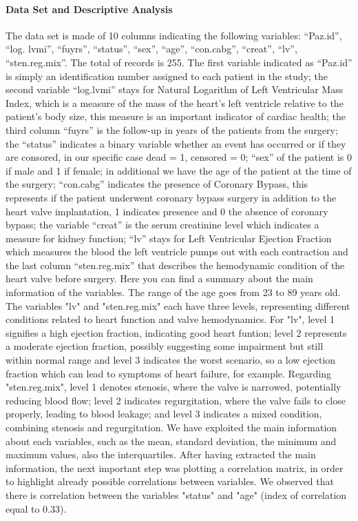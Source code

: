 \paragraph{Data Set and Descriptive Analysis}

The data set is made of 10 columns indicating the following variables: “Paz.id”, “log. lvmi”, “fuyrs”, “status”, “sex”, “age”, “con.cabg”, “creat”, “lv”, “sten.reg.mix”. The total of records is 255.
The first variable indicated as “Paz.id” is simply an identification number assigned to each patient in the study; the second variable “log.lvmi” stays for Natural Logarithm of Left Ventricular Mass Index, which is a measure of the mass of the heart’s left ventricle relative to the patient’s body size, this measure is an important indicator of cardiac health; the third column “fuyrs” is the follow-up in years of the patients from the surgery; the “status” indicates a binary variable whether an event has occurred or if they are consored, in our specific case dead = 1, censored = 0; “sex” of the patient is 0 if male and 1 if female; in additional we have the age of the patient at the time of the surgery; “con.cabg” indicates the presence of Coronary Bypass, this represents if the patient underwent coronary bypass surgery in addition to the heart valve implantation, 1 indicates presence and 0 the absence of coronary bypass; the variable “creat” is the serum creatinine level which indicates a measure for kidney function; “lv” stays for Left Ventricular Ejection Fraction which measures the blood the left ventricle pumps out with each contraction and the last column “sten.reg.mix” that describes the hemodynamic condition of the heart valve before surgery.
Here you can find a summary about the main information of the variables.
The range of the age goes from 23 to 89 years old.
The variables "lv" and "sten.reg.mix" each have three levels, representing different conditions related to heart function and valve hemodynamics.
For "lv", level 1 signifies a high ejection fraction, indicating good heart funtion; level 2 represents a moderate ejection fraction, possibly suggesting some impairment but still within normal range and level 3 indicates the worst scenario, so a low ejection fraction which can lead to symptoms of heart failure, for example. 
Regarding "sten.reg.mix", level 1 denotes stenosis, where the valve is narrowed, potentially reducing blood flow; level 2 indicates regurgitation, where the valve fails to close properly,  leading to blood leakage; and level 3 indicates a mixed condition, combining stenosis and regurgitation.
We have exploited the main information about each variables, such as the mean, standard deviation, the minimum and maximum values, also the interquartiles.
After having extracted the main information, the next important step was plotting a correlation matrix, in order to highlight already possible correlations between variables. We observed that there is correlation between the variables "status" and "age" (index of correlation equal to 0.33).